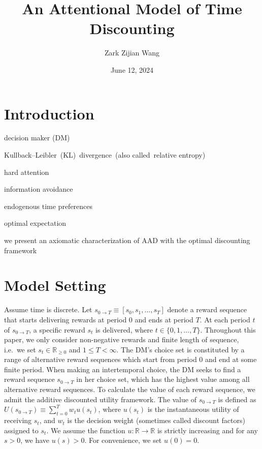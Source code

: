 \documentclass[
  12pt,
]{article}
\title{An Attentional Model of Time Discounting}
\author{Zark Zijian Wang}
\date{June 12, 2024}
\begin{document}
\maketitle

\hypertarget{introduction}{%
\section{Introduction}\label{introduction}}

decision maker (DM)

Kullback--Leibler~(KL)~divergence~(also called~relative entropy)

hard attention

information avoidance

endogenous time preferences

optimal expectation

we present an axiomatic characterization of AAD with the optimal
discounting framework

\hypertarget{model-setting}{%
\section{Model Setting}\label{model-setting}}

Assume time is discrete. Let
\(s_{0\rightarrow T}\equiv[s_0,s_1,...,s_T]\) denote a reward sequence
that starts delivering rewards at period 0 and ends at period \(T\). At
each period \(t\) of \(s_{0\rightarrow T}\), a specific reward \(s_t\)
is delivered, where \(t\in\{0,1,…,T\}\). Throughout this paper, we only
consider non-negative rewards and finite length of sequence, i.e.~we set
\(s_t \in \mathbb{R}_{\geq 0}\) and \(1\leq T<\infty\). The DM's choice
set is constituted by a range of alternative reward sequences which
start from period 0 and end at some finite period. When making an
intertemporal choice, the DM seeks to find a reward sequence
\(s_{0\rightarrow T}\) in her choice set, which has the highest value
among all alternative reward sequences. To calculate the value of each
reward sequence, we admit the additive discounted utility framework. The
value of \(s_{0\rightarrow T}\) is defined as
\(U(s_{0\rightarrow T})\equiv \sum_{t=0}^T w_{t}u(s_t)\), where
\(u(s_t)\) is the instantaneous utility of receiving \(s_t\), and
\(w_t\) is the decision weight (sometimes called discount factors)
assigned to \(s_t\). We assume the function
\(u:\mathbb{R}\rightarrow \mathbb{R}\) is strictly increasing and for
any \(s>0\), we have \(u(s)>0\). For convenience, we set \(u(0)=0\).
\end{document}
